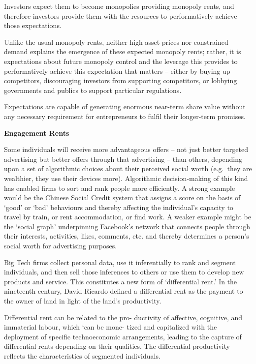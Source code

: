 \documentclass[
]{book}
\begin{document}
Investors expect them to
become monopolies providing monopoly rents, and therefore investors
provide them with the resources to performatively achieve those expectations.

Unlike the usual monopoly rents, neither high asset prices nor
constrained demand explains the emergence of these expected monopoly rents;
rather, it is expectations about future monopoly control and the leverage this
provides to performatively achieve this expectation that matters -- either by
buying up competitors, discouraging investors from supporting competitors,
or lobbying governments and publics to support particular regulations.

Expectations are capable of generating enormous near-term share value
without any necessary requirement for entrepreneurs to fulfil their
longer-term promises.

\textbf{Engagement Rents}

Some individuals will receive more advantageous offers -- not just
better targeted advertising but better offers through that advertising -- than
others, depending upon a set of algorithmic choices about their perceived
social worth (e.g.~they are wealthier, they use their devices more).
Algorithmic decision-making of this kind has
enabled firms to sort and rank people more efficiently.
A strong example would be
the Chinese Social Credit system that assigns a score on the basis of `good' or
`bad' behaviours and thereby affecting the individual's capacity to travel by
train, or rent accommodation, or find work.
A weaker example
might be the `social graph' underpinning Facebook's network that connects
people through their interests, activities, likes, comments, etc. and thereby
determines a person's social worth for advertising purposes.

Big Tech firms collect personal data, use it inferentially to rank and segment
individuals, and then sell those inferences to others or use them to develop new
products and service. This constitutes a new form of `differential rent.' In the
nineteenth century, David Ricardo defined a differential rent as the payment to
the owner of land in light of the land's productivity.

Differential rent can be related to the pro-
ductivity of affective, cognitive, and immaterial labour, which `can be mone-
tized and capitalized with the deployment of specific technoeconomic
arrangements, leading to the capture of differential rents depending on their
qualities.
The differential productivity reflects the characteristics of segmented individuals.
\end{document}
